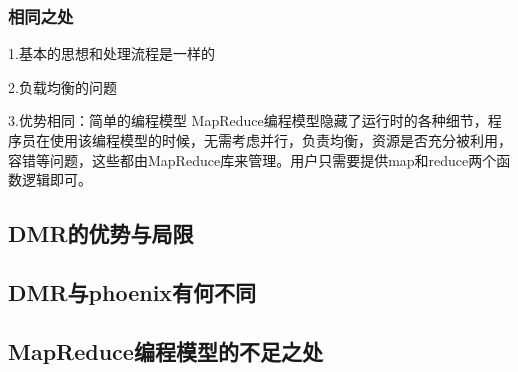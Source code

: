 \subsubsection{相同之处}
1.基本的思想和处理流程是一样的


2.负载均衡的问题

3.优势相同：简单的编程模型
MapReduce编程模型隐藏了运行时的各种细节，程序员在使用该编程模型的时候，无需考虑并行，负责均衡，资源是否充分被利用，容错等问题，这些都由MapReduce库来管理。用户只需要提供map和reduce两个函数逻辑即可。

\subsection{DMR的优势与局限}

\subsection{DMR与phoenix有何不同}

\subsection{MapReduce编程模型的不足之处}


